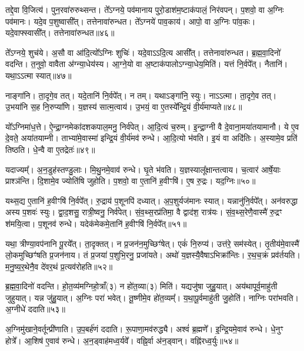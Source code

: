 तद्दे॒वा वि॒जित्य॑।
पुन॒रवा॑रुरुथ्सन्त।
ते᳚ऽग्नये॒ पव॑मानाय पुरो॒डाश॑म॒ष्टा\-क॑पालं॒ निर॑वपन्।
प॒शवो॒ वा अ॒ग्निः पव॑मानः।
यदे॒व प॒शुष्वासी᳚त्।
तत्तेनावा॑रुन्धत।
ते᳚ऽग्नये॑ पाव॒काय॑।
आपो॒ वा अ॒ग्निः पा॑व॒कः।
यदे॒वाफ्स्वासी᳚त्।
तत्तेनावा॑रुन्धत॥४६॥\ip

ते᳚ऽग्नये॒ शुच॑ये।
अ॒सौ वा आ॑दि॒त्यो᳚\-ऽग्निः शुचिः॑।
यदे॒वाऽऽदि॒त्य आसी᳚त्।
तत्तेनावा॑रुन्धत।
ब्र॒ह्म॒वा॒दिनो॑ वदन्ति।
त॒नुवो॒ वावैता अ॑ग्न्या॒धेय॑स्य।
आ॒ग्ने॒यो वा अ॒ष्टा\-क॑पालो\-ऽग्न्या॒धेय॒मिति॑।
यत्तं नि॒र्वपे᳚त्।
नैतानि॑।
यथा॒ऽऽत्मा स्यात्॥४७॥\ip

नाङ्गा॑नि।
ता॒दृगे॒व तत्।
यदे॒तानि॑ नि॒र्वपे᳚त्।
न तम्।
यथाऽङ्गा॑नि॒ स्युः।
नाऽऽत्मा।
ता॒दृगे॒व तत्।
उ॒भया॑नि स॒ह नि॒रुप्या॑णि।
य॒ज्ञस्य॑ सात्म॒त्वाय॑।
उ॒भयं॒ वा ए॒तस्ये᳚न्द्रि॒यं वी॒र्य॑माप्यते॥४८॥\ip

यो᳚ऽग्निमा॑ध॒त्ते।
ऐ॒न्द्रा॒ग्नमेका॑\-दश\-कपाल॒मनु॒ निर्व॑पेत्।
आ॒दि॒त्यं च॒रुम्।
इ॒न्द्रा॒ग्नी वै दे॒वाना॒मया॑तयामानौ।
ये ए॒व दे॒वते॒ अया॑तयाम्नी।
ताभ्या॑मे॒वास्मा॑ इन्द्रि॒यं वी॒र्य॑मव॑ रुन्धे।
आ॒दि॒त्यो भ॑वति।
इ॒यं वा अदि॑तिः।
अ॒स्यामे॒व प्रति॑ तिष्ठति।
धे॒न्वै वा ए॒तद्रेतः॑॥४९॥\ip

यदाज्यम्᳚।
अ॒न॒डुह॑स्तण्डु॒लाः।
मि॒थु॒नमे॒वाव॑ रुन्धे।
घृ॒ते भ॑वति।
य॒ज्ञस्यालू᳚क्षान्तत्वाय।
च॒त्वार॑ आर्\mbox{}षे॒याः प्राश्ञ॑न्ति।
दि॒शामे॒व ज्योति॑षि जुहोति।
प॒शवो॒ वा ए॒तानि॑ ह॒वीꣳषि॑।
ए॒ष रु॒द्रः।
यद॒ग्निः॥५०॥\ip

यथ्स॒द्य ए॒तानि॑ ह॒वीꣳषि॑ नि॒र्वपे᳚त्।
रु॒द्राय॑ प॒शूनपि॑ दध्यात्।
अ॒प॒शुर्यज॑मानः स्यात्।
यन्नानु॑नि॒र्वपे᳚त्।
अन॑वरुद्धा अस्य प॒शवः॑ स्युः।
द्वा॒द॒शसु॒ रात्री॒ष्वनु॒ निर्व॑पेत्।
सं॒व॒थ्स॒रप्र॑तिमा॒ वै द्वाद॑श॒ रात्र॑यः।
सं॒व॒थ्स॒रेणै॒वास्मै॑ रु॒द्रꣳ श॑मयि॒त्वा।
प॒शूनव॑ रुन्धे।
यदेक॑मेकमे॒तानि॑ ह॒वीꣳषि॑ नि॒र्वपे᳚त्॥५१॥\ip

यथा॒ त्रीण्या॒वप॑नानि पू॒रये᳚त्।
ता॒दृक्तत्।
न प्र॒जन॑न॒\-मुच्छिꣳ॑षेत्।
एकं॑ नि॒रुप्य॑।
उत्त॑रे॒ सम॑स्येत्।
तृ॒तीय॑मे॒वास्मै॑ लो॒कमुच्छिꣳ॑षति प्र॒जन॑नाय।
तं प्र॒जया॑ प॒शुभि॒रनु॒\- प्रजा॑यते।
अथो॑ य॒ज्ञस्यै॒वैषा\-ऽभिक्रा᳚न्तिः।
र॒थ॒च॒क्रं प्रव॑र्तयति।
म॒नु॒ष्य॒र॒थेनै॒व दे॑वर॒थं प्र॒त्यव॑रोहति॥५२॥\ip

ब्र॒ह्म॒वा॒दिनो॑ वदन्ति।
हो॒त॒व्य॑मग्निहो॒त्राँ(३) न हो॑त॒व्या(३) मिति॑।
यद्यजु॑षा जुहु॒यात्।
अय॑था\-पूर्व॒माहु॑ती जुहुयात्।
यन्न जु॑हु॒यात्।
अ॒ग्निः परा॑ भवेत्।
तू॒ष्णीमे॒व हो॑त॒व्यम्᳚।
य॒था॒पू॒र्वमाहु॑ती जु॒होति॑।
नाग्निः परा॑भवति।
अ॒ग्नीधे॑ ददाति॥५३॥\ip

अ॒ग्निमु॑खाने॒वर्तून्प्री॑णाति।
उ॒प॒बर्\mbox{}ह॑णं ददाति।
रू॒पाणा॒मव॑\-रुद्ध्यै।
अश्वं॑ ब्र॒ह्मणे᳚।
इ॒न्द्रि॒यमे॒वाव॑ रुन्धे।
धे॒नुꣳ होत्रे᳚।
आ॒शिष॑ ए॒वाव॑ रुन्धे।
अ॒न॒ड्वाह॑मध्व॒र्यवे᳚।
वह्नि॒र्वा अ॑न॒ड्वान्।
वह्नि॑रध्व॒र्युः॥५४॥\ip

